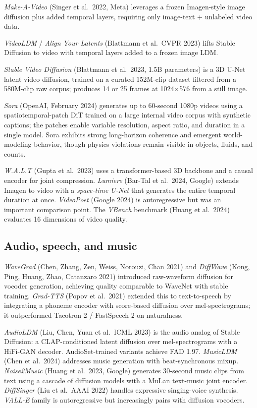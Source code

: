 \emph{Make-A-Video} (Singer et al.~2022, Meta) leverages a frozen Imagen-style image diffusion plus added temporal layers, requiring only image-text + unlabeled video data.

\emph{VideoLDM} / \emph{Align Your Latents} (Blattmann et al.~CVPR 2023) lifts Stable Diffusion to video with temporal layers added to a frozen image LDM.

\emph{Stable Video Diffusion} (Blattmann et al.~2023, 1.5B parameters) is a 3D U-Net latent video diffusion, trained on a curated 152M-clip dataset filtered from a 580M-clip raw corpus; produces 14 or 25 frames at 1024×576 from a still image.

\emph{Sora} (OpenAI, February 2024) generates up to 60-second 1080p videos using a spatiotemporal-patch DiT trained on a large internal video corpus with synthetic captions; the patches enable variable resolution, aspect ratio, and duration in a single model. Sora exhibits strong long-horizon coherence and emergent world-modeling behavior, though physics violations remain visible in objects, fluids, and counts.

\emph{W.A.L.T} (Gupta et al.~2023) uses a transformer-based 3D backbone and a causal encoder for joint compression. \emph{Lumiere} (Bar-Tal et al.~2024, Google) extends Imagen to video with a \emph{space-time U-Net} that generates the entire temporal duration at once. \emph{VideoPoet} (Google 2024) is autoregressive but was an important comparison point. The \emph{VBench} benchmark (Huang et al.~2024) evaluates 16 dimensions of video quality.

\subsection{Audio, speech, and music}\label{audio-speech-and-music}

\emph{WaveGrad} (Chen, Zhang, Zen, Weiss, Norouzi, Chan 2021) and \emph{DiffWave} (Kong, Ping, Huang, Zhao, Catanzaro 2021) introduced raw-waveform diffusion for vocoder generation, achieving quality comparable to WaveNet with stable training. \emph{Grad-TTS} (Popov et al.~2021) extended this to text-to-speech by integrating a phoneme encoder with score-based diffusion over mel-spectrograms; it outperformed Tacotron 2 / FastSpeech 2 on naturalness.

\emph{AudioLDM} (Liu, Chen, Yuan et al.~ICML 2023) is the audio analog of Stable Diffusion: a CLAP-conditioned latent diffusion over mel-spectrograms with a HiFi-GAN decoder. AudioSet-trained variants achieve FAD 1.97. \emph{MusicLDM} (Chen et al.~2024) addresses music generation with beat-synchronous mixup. \emph{Noise2Music} (Huang et al.~2023, Google) generates 30-second music clips from text using a cascade of diffusion models with a MuLan text-music joint encoder. \emph{DiffSinger} (Liu et al.~AAAI 2022) handles expressive singing-voice synthesis. \emph{VALL-E} family is autoregressive but increasingly pairs with diffusion vocoders.

